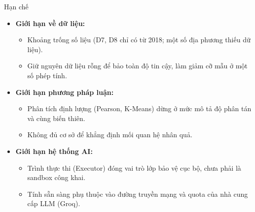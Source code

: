 \begin{frame}[t]{Hạn chế}
  \begin{itemize}
    \setlength{\itemsep}{10pt}
    \item \textbf{Giới hạn về dữ liệu:}
    \begin{itemize}
      \item Khoảng trống số liệu (D7, D8 chỉ có từ 2018; một số địa phương thiếu dữ liệu).
      \item Giữ nguyên dữ liệu rỗng để bảo toàn độ tin cậy, làm giảm cỡ mẫu ở một số phép tính.
    \end{itemize}
    \item \textbf{Giới hạn phương pháp luận:}
    \begin{itemize}
      \item Phân tích định lượng (Pearson, K-Means) dừng ở mức mô tả độ phân tán và cùng biến thiên.
      \item Không đủ cơ sở để khẳng định mối quan hệ nhân quả.
    \end{itemize}
    \item \textbf{Giới hạn hệ thống AI:}
    \begin{itemize}
      \item Trình thực thi (Executor) đóng vai trò lớp bảo vệ cục bộ, chưa phải là sandbox công khai.
      \item Tính sẵn sàng phụ thuộc vào đường truyền mạng và quota của nhà cung cấp LLM (Groq).
    \end{itemize}
  \end{itemize}
\end{frame}

